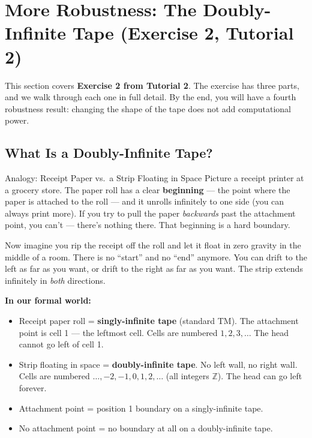 \section{More Robustness: The Doubly-Infinite Tape (Exercise 2, Tutorial 2)} \kemark

This section covers \textbf{Exercise 2 from Tutorial 2}. The exercise has three
parts, and we walk through each one in full detail. By the end, you will have a
fourth robustness result: changing the shape of the tape does not add
computational power.

\subsection{What Is a Doubly-Infinite Tape?}
\label{subsec:doubly-infinite-what}

\begin{notebox}{Analogy: Receipt Paper vs.\ a Strip Floating in Space}
Picture a receipt printer at a grocery store. The paper roll has a clear
\textbf{beginning} --- the point where the paper is attached to the roll ---
and it unrolls infinitely to one side (you can always print more). If you try
to pull the paper \emph{backwards} past the attachment point, you can't ---
there's nothing there. That beginning is a hard boundary.

Now imagine you rip the receipt off the roll and let it float in zero gravity
in the middle of a room. There is no ``start'' and no ``end'' anymore. You
can drift to the left as far as you want, or drift to the right as far as you
want. The strip extends infinitely in \emph{both} directions.

\textbf{In our formal world:}
\begin{itemize}[nosep]
\item Receipt paper roll = \textbf{singly-infinite tape} (standard TM). The
  attachment point is cell 1 --- the leftmost cell. Cells are numbered
  $1, 2, 3, \ldots$ The head cannot go left of cell 1.
\item Strip floating in space = \textbf{doubly-infinite tape}. No left wall,
  no right wall. Cells are numbered $\ldots, -2, -1, 0, 1, 2, \ldots$ (all
  integers $\mathbb{Z}$). The head can go left forever.
\item Attachment point = position 1 boundary on a singly-infinite tape.
\item No attachment point = no boundary at all on a doubly-infinite tape.
\end{itemize}
\end{notebox}

